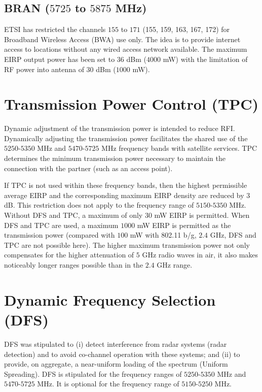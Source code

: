 \subsection{BRAN ($5725$ to $5875$ MHz)}%

ETSI has restricted the channels $155$ to $171$ (155, 159, 163, 167, 172) for Broadband Wireless Access (BWA) use only. The idea is to provide internet access to locations without any wired access network available. The maximum EIRP output power has been set to $36$ dBm ($4000$ mW) with the limitation of RF power into antenna of $30$ dBm ($1000$ mW).


\section{Transmission Power Control (TPC)}

Dynamic adjustment of the transmission power is intended to reduce RFI. Dynamically adjusting the transmission power facilitates the shared use of the $5250$-$5350$ MHz and $5470$-$5725$ MHz frequency bands with satellite services. TPC determines the minimum transmission power necessary to maintain the connection with the partner (such as an access point).

If TPC is not used within these frequency bands, then the highest permissible average EIRP and the corresponding maximum EIRP density are reduced by $3$ dB. This restriction does not apply to the frequency range of $5150$-$5350$ MHz. Without DFS and TPC, a maximum of only $30$ mW EIRP is permitted. When DFS and TPC are used, a maximum $1000$ mW EIRP is permitted as the transmission power (compared with $100$ mW with 802.11 b/g, $2.4$ GHz, DFS and TPC are not possible here). The higher maximum transmission power not only compensates for the higher attenuation of $5$ GHz radio waves in air, it also makes noticeably longer ranges possible than in the $2.4$ GHz range. 


\section{Dynamic Frequency Selection (DFS)}

DFS was stipulated to (i) detect interference from radar systems (radar detection) and to avoid co-channel operation with these systems; and (ii) to provide, on aggregate, a near-uniform loading of the spectrum (Uniform Spreading). DFS is stipulated for the frequency ranges of $5250$-$5350$ MHz and $5470$-$5725$ MHz. It is optional for the frequency range of $5150$-$5250$ MHz.

